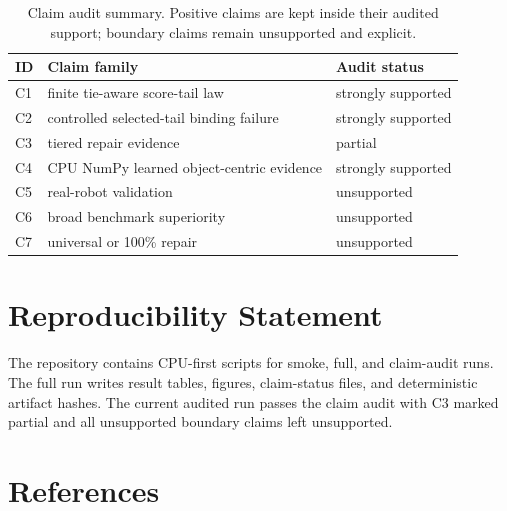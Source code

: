 \documentclass[10pt]{article}
\begin{document}
\begin{table}[t]
  \centering
  \caption{Claim audit summary. Positive claims are kept inside their audited support; boundary claims remain unsupported and explicit.}
  \label{tab:claims}
  \begin{tabular}{lll}
    \toprule
    ID & Claim family & Audit status \\
    \midrule
    C1 & finite tie-aware score-tail law & strongly supported \\
    C2 & controlled selected-tail binding failure & strongly supported \\
    C3 & tiered repair evidence & partial \\
    C4 & CPU NumPy learned object-centric evidence & strongly supported \\
    C5 & real-robot validation & unsupported \\
    C6 & broad benchmark superiority & unsupported \\
    C7 & universal or 100\% repair & unsupported \\
    \bottomrule
  \end{tabular}
\end{table}

\section*{Reproducibility Statement}

The repository contains CPU-first scripts for smoke, full, and claim-audit runs. The full run writes result tables, figures, claim-status files, and deterministic artifact hashes. The current audited run passes the claim audit with C3 marked partial and all unsupported boundary claims left unsupported.

\section*{References}
\end{document}
